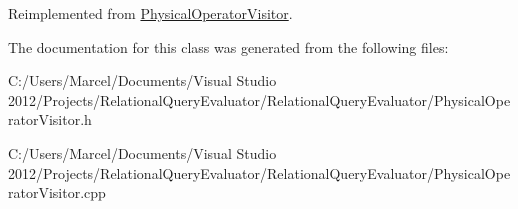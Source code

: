Reimplemented from \hyperlink{class_physical_operator_visitor_adbb3e6618904bc7e6d0b6aa3958132e9}{Physical\+Operator\+Visitor}.



The documentation for this class was generated from the following files\+:\begin{DoxyCompactItemize}
\item 
C\+:/\+Users/\+Marcel/\+Documents/\+Visual Studio 2012/\+Projects/\+Relational\+Query\+Evaluator/\+Relational\+Query\+Evaluator/Physical\+Operator\+Visitor.\+h\item 
C\+:/\+Users/\+Marcel/\+Documents/\+Visual Studio 2012/\+Projects/\+Relational\+Query\+Evaluator/\+Relational\+Query\+Evaluator/Physical\+Operator\+Visitor.\+cpp\end{DoxyCompactItemize}
